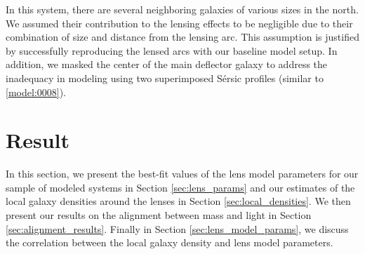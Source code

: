 \documentclass{aa}
\newcommand{\newedit}[1]{{#1}} %
\begin{document}
In this system, there are several neighboring galaxies of various sizes in the north. We assumed their contribution to the lensing effects to be negligible due to their combination of size and distance from the lensing arc. This assumption is justified by successfully reproducing the lensed arcs with our baseline model setup. \newedit{In addition, we masked the center of the main deflector galaxy to address the inadequacy in modeling using two superimposed S\'ersic profiles (similar to \ref{model:0008}).}


\section{Result} \label{sec:result}

In this section, we present the best-fit values of the lens model parameters for our sample of modeled systems in Section \ref{sec:lens_params} and our estimates of the local galaxy densities around the lenses in Section \ref{sec:local_densities}. We then present our results on the alignment between mass and light in Section \ref{sec:alignment_results}. Finally in Section \ref{sec:lens_model_params}, we discuss the correlation between the local galaxy density and lens
model parameters.  %
\end{document}
